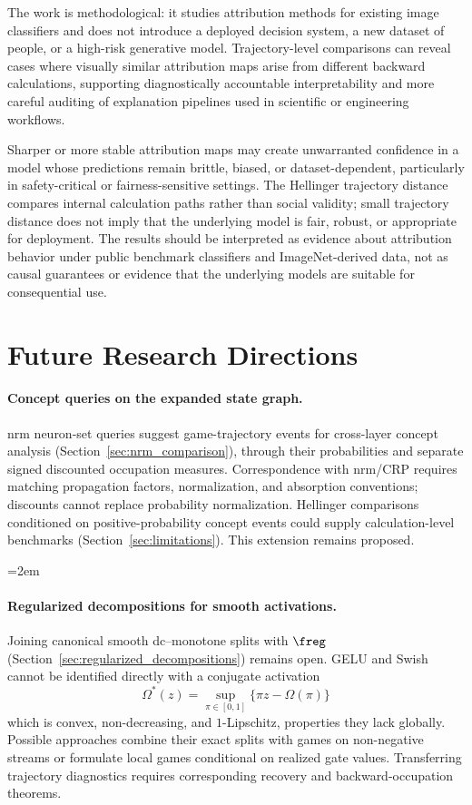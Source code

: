 The work is methodological: it studies attribution methods for existing image classifiers and does not introduce a deployed decision system, a new dataset of people, or a high-risk generative model. Trajectory-level comparisons can reveal cases where visually similar attribution maps arise from different backward calculations, supporting diagnostically accountable interpretability and more careful auditing of explanation pipelines used in scientific or engineering workflows.

Sharper or more stable attribution maps may create unwarranted confidence in a model whose predictions remain brittle, biased, or dataset-dependent, particularly in safety-critical or fairness-sensitive settings. The Hellinger trajectory distance compares internal calculation paths rather than social validity; small trajectory distance does not imply that the underlying model is fair, robust, or appropriate for deployment. The results should be interpreted as evidence about attribution behavior under public benchmark classifiers and ImageNet-derived data, not as causal guarantees or evidence that the underlying models are suitable for consequential use.

\section{Future Research Directions}\label{sec:future_directions}

\paragraph{Concept queries on the expanded state graph.} \ac{nrm} neuron-set queries \parencite{Xiong2026nrm} suggest game-trajectory events for cross-layer concept analysis (Section~\ref{sec:nrm_comparison}), through their probabilities and separate signed discounted occupation measures. Correspondence with \ac{nrm}/CRP requires matching propagation factors, normalization, and absorption conventions; discounts cannot replace probability normalization. Hellinger comparisons conditioned on positive-probability concept events could supply calculation-level benchmarks (Section~\ref{sec:limitations}). This extension remains proposed.

{\emergencystretch=2em
\paragraph{Regularized decompositions for smooth activations.} Joining canonical smooth \ac{dc}--\allowbreak{}monotone splits with $\freg$ (Section~\ref{sec:regularized_decompositions}) remains open. GELU and Swish cannot be identified directly with a conjugate activation
\[
\Omega^*(z)=\sup_{\pi\in[0,1]}\{\pi z-\Omega(\pi)\}
\]
which is convex, non-decreasing, and $1$-Lipschitz, properties they lack globally. Possible approaches combine their exact splits with games on non-negative streams or formulate local games conditional on realized gate values. Transferring trajectory diagnostics requires corresponding recovery and backward-occupation theorems.\par}

